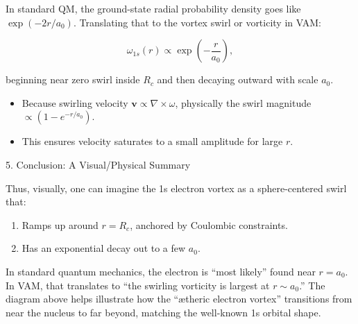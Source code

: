 In standard QM, the ground-state radial probability density goes like \(\exp(-2r/a_0)\). Translating that to the vortex swirl or vorticity in VAM:

\[
\omega_{1s}(r) \propto \exp\left(-\frac{r}{a_0}\right),
\]

beginning near zero swirl inside \(R_c\) and then decaying outward with scale \(a_0\).

\begin{itemize}
    \item Because swirling velocity \(\mathbf{v} \propto \nabla \times \omega\), physically the swirl magnitude \(\propto (1 - e^{-r/a_0})\).
    \item This ensures velocity saturates to a small amplitude for large \(r\).
\end{itemize}

5. Conclusion: A Visual/Physical Summary

Thus, visually, one can imagine the 1s electron vortex as a sphere-centered swirl that:

\begin{enumerate}
    \item Ramps up around \(r = R_c\), anchored by Coulombic constraints.
    \item Has an exponential decay out to a few \(a_0\).
\end{enumerate}

In standard quantum mechanics, the electron is “most likely” found near \(r = a_0\). In VAM, that translates to “the swirling vorticity is largest at \(r \sim a_0\).” The diagram above helps illustrate how the “ætheric electron vortex” transitions from near the nucleus to far beyond, matching the well-known 1s orbital shape.